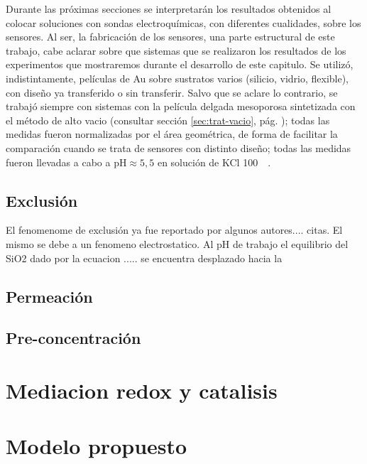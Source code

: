 	Durante las próximas secciones se interpretarán los resultados obtenidos al colocar soluciones con sondas electroquímicas, con diferentes cualidades, sobre los sensores. Al ser,  la fabricación de los sensores, una parte estructural de este trabajo, cabe aclarar sobre que sistemas que se realizaron los resultados de los experimentos que mostraremos durante el desarrollo de este capitulo. Se utilizó, indistintamente, películas de Au sobre sustratos varios (silicio, vidrio, flexible), con diseño ya transferido o sin transferir. Salvo que se aclare lo contrario, se trabajó siempre con sistemas con la película delgada mesoporosa sintetizada con el método de alto vacio (consultar sección \ref{sec:trat-vacio}, pág. \pageref{sec:trat-vacio}); todas las medidas fueron normalizadas por el área geométrica, de forma de facilitar la comparación cuando se trata de sensores con distinto diseño; todas las medidas fueron llevadas a cabo a pH$\approx 5,5$ en solución de KCl \SI{100}{\milli\Molar}.

	\subsection{Exclusión}

	El fenomenome de exclusión ya fue reportado por algunos autores.... citas. El mismo se debe a un fenomeno electrostatico. Al pH de trabajo el equilibrio del SiO2 dado por la ecuacion ..... se encuentra desplazado hacia la

	\subsection{Permeación}

	\subsection{Pre-concentración}

\section{Mediacion redox y catalisis}

\section{Modelo propuesto}

